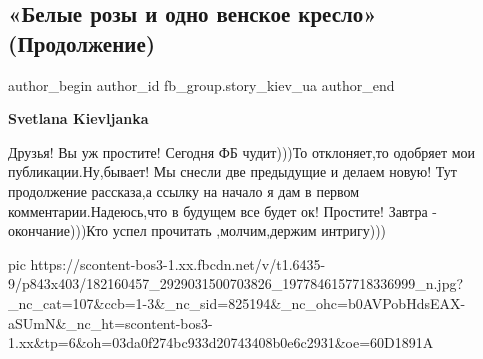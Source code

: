  
 
 
 
 
 
\subsection{«Белые розы и одно венское кресло» (Продолжение)}
\label{sec:21_05_2021.fb.fb_group.story_kiev_ua.1.belye_rozy_prodolzhenie}
\ifcmt
 author_begin
   author_id fb_group.story_kiev_ua
 author_end
\fi

\textbf{Svetlana Kievljanka}

Друзья! Вы уж простите! Сегодня ФБ чудит)))То отклоняет,то одобряет мои публикации.Ну,бывает! Мы снесли две предыдущие и делаем новую! Тут продолжение рассказа,а ссылку на начало я дам в первом комментарии.Надеюсь,что в будущем все будет ок! Простите! Завтра - окончание)))Кто успел прочитать ,молчим,держим интригу)))


\ifcmt
  pic https://scontent-bos3-1.xx.fbcdn.net/v/t1.6435-9/p843x403/182160457_2929031500703826_1977846157718336999_n.jpg?_nc_cat=107&ccb=1-3&_nc_sid=825194&_nc_ohc=b0AVPobHdsEAX-aSUmN&_nc_ht=scontent-bos3-1.xx&tp=6&oh=03da0f274bc933d20743408b0e6c2931&oe=60D1891A
\fi


